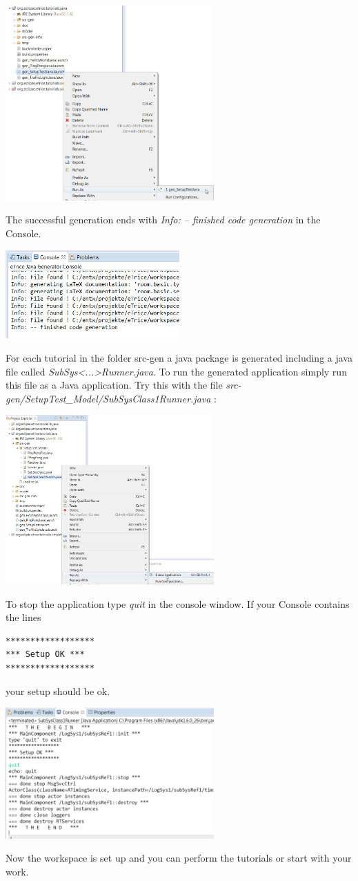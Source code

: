 \includegraphics[width=0.6\textwidth]{images/013-SetupWorkspace05.png}

The successful generation ends with \emph{Info: -- finished code generation} in the Console.

\includegraphics[width=0.5\textwidth]{images/013-SetupWorkspace051.png}

For each tutorial in the folder src-gen a java package is generated including a java file called 
\emph{SubSys<...>Runner.java}. To run the generated application simply run this file as a Java application.
Try this with the file \emph{src-gen/SetupTest\_Model/SubSysClass1Runner.java} :

\includegraphics[width=0.6\textwidth]{images/013-SetupWorkspace06.png}

To stop the application type \emph{quit} in the console window. If your Console contains the lines
\begin{verbatim}
******************
*** Setup OK ***
******************
\end{verbatim}
your setup should be ok.

\includegraphics[width=0.6\textwidth]{images/013-SetupWorkspace07.png} 

Now the workspace is set up and you can perform the tutorials or start with your work.
